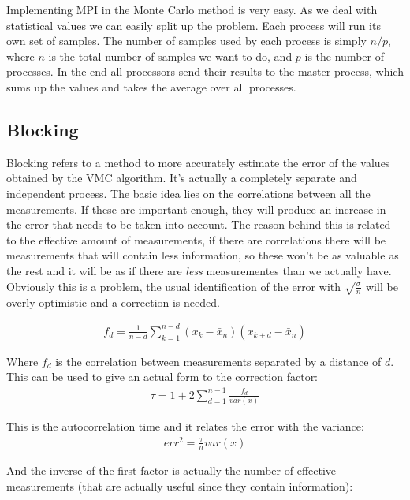 		Implementing MPI in the Monte Carlo method is very easy. As we deal with statistical values we can easily split up the problem. Each process will run its own set of samples. The number of samples used by each process is simply $n/p$, where $n$ is the total number of samples we want to do, and $p$ is the number of processes. In the end all processors send their results to the master process, which sums up the values and takes the average over all processes.

	\subsection{Blocking}
	\label{sec:blocking}
		Blocking refers to a method to more accurately estimate the error of the values obtained by the VMC algorithm. It's actually a completely separate and independent process. The basic idea lies on the correlations between all the measurements. If these are important enough, they will produce an increase in the error that needs to be taken into account. The reason behind this is related to the effective amount of measurements, if there are correlations there will be measurements that will contain less information, so these won't be as valuable as the rest and it will be as if there are \textit{less} measurementes than we actually have. Obviously this is a problem, the usual identification of the error with $\sqrt{\frac{\sigma}{n}}$ will be overly optimistic and a correction is needed.

		\begin{align}
			f_d=\frac{1}{n-d}\sum_{k=1}^{n-d}{\left(x_k-\bar{x}_n\right)\left(x_{k+d}-\bar{x}_n\right)}
		\end{align}

		Where $f_d$ is the correlation between measurements separated by a distance of $d$. This can be used to give an actual form to the correction factor:\\

		\begin{align}
			\tau=1+2\sum_{d=1}^{n-1}{\frac{f_d}{var\left(x\right)}}
		\end{align}

		This is the autocorrelation time and it relates the error with the variance:\\

		\begin{align}
			err^2=\frac{\tau}{n}var\left(x\right)
		\end{align}

		And the inverse of the first factor is actually the number of effective measurements (that are actually useful since they contain information):\\

